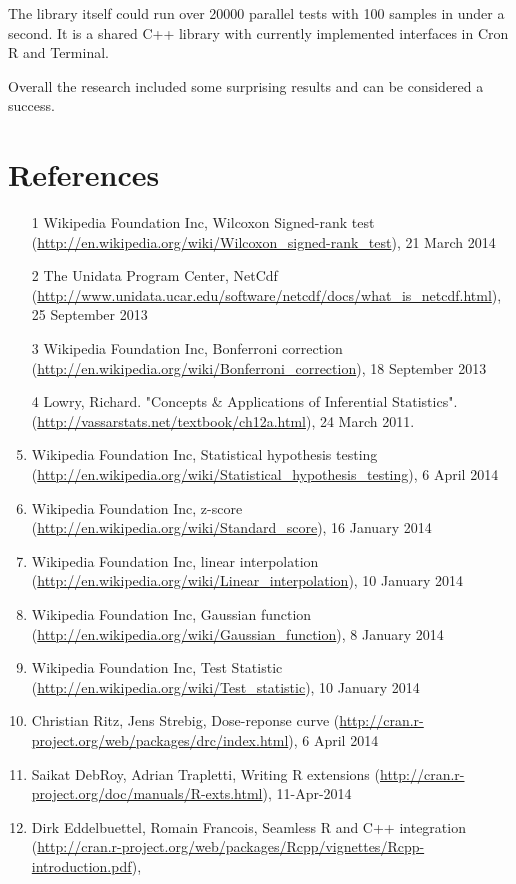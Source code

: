 \documentclass[12pt]{article}
\begin{document}
The library itself could run over 20000 parallel tests with 100 samples in under a second. It is a shared C++ library with currently implemented interfaces in Cron R and Terminal.

Overall the research included some surprising results and can be considered a success.

\newpage

\section{References}
\begin{enumerate}
\item
[1] Wikipedia Foundation Inc, Wilcoxon Signed-rank test (\url{http://en.wikipedia.org/wiki/Wilcoxon_signed-rank_test}),  21 March 2014
\item
[2] The Unidata Program Center, NetCdf (\url{http://www.unidata.ucar.edu/software/netcdf/docs/what_is_netcdf.html}), 25 September 2013
\item
[3] Wikipedia Foundation Inc, Bonferroni correction (\url{http://en.wikipedia.org/wiki/Bonferroni_correction}), 18 September 2013
\item
[4]  Lowry, Richard. "Concepts \& Applications of Inferential Statistics". (\url{http://vassarstats.net/textbook/ch12a.html}), 24 March 2011.
\item Wikipedia Foundation Inc, Statistical hypothesis testing (\url{http://en.wikipedia.org/wiki/Statistical_hypothesis_testing}), 6 April 2014
\item Wikipedia Foundation Inc, z-score (\url{http://en.wikipedia.org/wiki/Standard_score}), 16 January 2014
\item Wikipedia Foundation Inc, linear interpolation (\url{http://en.wikipedia.org/wiki/Linear_interpolation}), 10 January 2014
\item Wikipedia Foundation Inc, Gaussian function (\url{http://en.wikipedia.org/wiki/Gaussian_function}), 8 January 2014
\item Wikipedia Foundation Inc, Test Statistic (\url{http://en.wikipedia.org/wiki/Test_statistic}), 10 January 2014
\item Christian Ritz, Jens Strebig, Dose-reponse curve (\url{http://cran.r-project.org/web/packages/drc/index.html}), 6 April 2014
\item Saikat DebRoy, Adrian Trapletti, Writing R extensions (\url{http://cran.r-project.org/doc/manuals/R-exts.html}), 11-Apr-2014
\item Dirk Eddelbuettel, Romain Francois, Seamless R and C++ integration (\url{http://cran.r-project.org/web/packages/Rcpp/vignettes/Rcpp-introduction.pdf}),
\end{enumerate}
\end{document}
